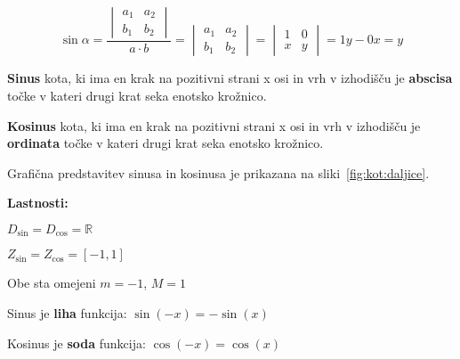 \documentclass[a4paper,oneside,12pt,fleqn]{article}
\def\R{\ensuremath{\mathbb R}}
\newcommand\krat\cdot
\def\kos{\cos}
\numberwithin{equation}{section}
\newenvironment{enumerate*}%
{
\vspace{-12pt}%
\begin{enumerate}%
\setlength{\itemsep}{0pt}%
\setlength{\parskip}{2pt}}%
{\end{enumerate}}
\begin{document}
\begin{equation}
  \sin\alpha = \frac{\begin{vmatrix} a_1 & a_2 \\ b_1 & b_2 \end{vmatrix}}{a\krat b} =
  \begin{vmatrix} a_1 & a_2 \\ b_1 & b_2 \end{vmatrix} =
  \begin{vmatrix} 1 & 0 \\ x & y \end{vmatrix} = 1y - 0x = y
  \label{eq:kot:sindef}
\end{equation}


\textbf{Sinus} kota, ki ima en krak na pozitivni strani x osi in vrh v izhodišču je
\textbf{abscisa} točke v kateri drugi krat seka enotsko krožnico.

\textbf{Kosinus} kota, ki ima en krak na pozitivni strani x osi in vrh v izhodišču je
\textbf{ordinata} točke v kateri drugi krat seka enotsko krožnico.

Grafična predstavitev sinusa in kosinusa je prikazana na sliki~\ref{fig:kot:daljice}.

\textbf{Lastnosti:}
\begin{enumerate*}
  \item $D_{\sin} = D_{\cos} = \R$
  \item $Z_{\sin} = Z_{\cos} = [-1,1]$
  \item Obe sta omejeni $m = -1$, $M = 1$
  \item Sinus je \textbf{liha} funkcija: $\sin(-x) = -\sin(x)$
  \item Kosinus je \textbf{soda} funkcija: $\kos(-x) = \kos(x)$
\end{enumerate*}
\end{document}
